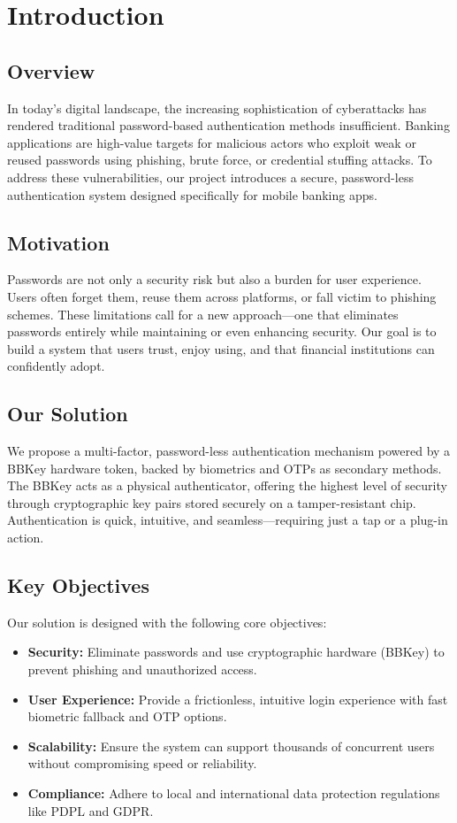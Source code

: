 \documentclass{article}[12pt]
\begin{document}
\section*{Introduction}

\subsection*{Overview}
In today’s digital landscape, the increasing sophistication of cyberattacks has rendered traditional password-based authentication methods insufficient. Banking applications are high-value targets for malicious actors who exploit weak or reused passwords using phishing, brute force, or credential stuffing attacks. To address these vulnerabilities, our project introduces a secure, password-less authentication system designed specifically for mobile banking apps.

\subsection*{Motivation}
Passwords are not only a security risk but also a burden for user experience. Users often forget them, reuse them across platforms, or fall victim to phishing schemes. These limitations call for a new approach—one that eliminates passwords entirely while maintaining or even enhancing security. Our goal is to build a system that users trust, enjoy using, and that financial institutions can confidently adopt.

\subsection*{Our Solution}
We propose a multi-factor, password-less authentication mechanism powered by a BBKey hardware token, backed by biometrics and OTPs as secondary methods. The BBKey acts as a physical authenticator, offering the highest level of security through cryptographic key pairs stored securely on a tamper-resistant chip. Authentication is quick, intuitive, and seamless—requiring just a tap or a plug-in action.

\subsection*{Key Objectives}
Our solution is designed with the following core objectives:
\begin{itemize}
    \item \textbf{Security:} Eliminate passwords and use cryptographic hardware (BBKey) to prevent phishing and unauthorized access.
    \item \textbf{User Experience:} Provide a frictionless, intuitive login experience with fast biometric fallback and OTP options.
    \item \textbf{Scalability:} Ensure the system can support thousands of concurrent users without compromising speed or reliability.
    \item \textbf{Compliance:} Adhere to local and international data protection regulations like PDPL and GDPR.
\end{itemize}
\end{document}
